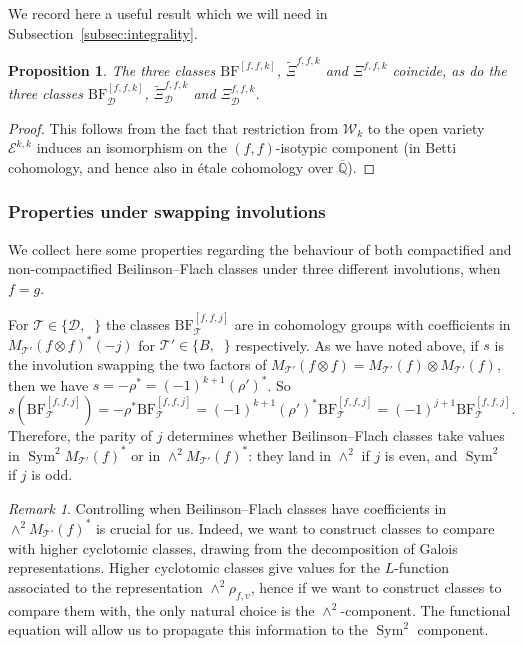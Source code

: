 \documentclass[11pt, a4paper, reqno]{amsart}
\theoremstyle{definition}
\theoremstyle{plain}
\newtheorem{proposition}[definition]{Proposition}
\theoremstyle{remark}
\newtheorem*{remark}{Remark}
\DeclareMathOperator{\Sym}{Sym}
\DeclareMathOperator{\et}{\acute{e}t}
\newcommand{\numberset}{\mathbb}
\newcommand{\Q}{\numberset{Q}}
\newcommand{\Ell}{\mathcal{E}}
\newcommand{\KS}{\mathscr{W}}
\newcommand{\theory}{\mathcal{T}}
\newcommand{\BF}{\mathrm{BF}}
\newcommand{\lcBF}{\widetilde{\Xi}}
\newcommand{\cBF}{\Xi}
\newcommand{\del}{\mathcal{D}}
\begin{document}
We record here a useful result which we will need in Subsection~\ref{subsec:integrality}.

\begin{proposition}
    \label{prop:classes-of-f-coincide}
    The three classes $\BF^{[f,f,k]}_{\et}$, $\lcBF^{f,f,k}_{\et}$ and $\cBF^{f,f,k}_{\et}$ coincide, as do the three classes $\BF^{[f,f,k]}_{\del}$, $\lcBF^{f,f,k}_{\del}$ and $\cBF^{f,f,k}_{\del}$.
\end{proposition}

\begin{proof}
 This follows from the fact that restriction from $\KS_k$ to the open variety $\Ell^{k, k}$ induces an isomorphism on the $(f, f)$-isotypic component (in Betti cohomology, and hence also in \'etale cohomology over $\overline{\Q}$).
\end{proof}

\subsubsection{Properties under swapping involutions}
\label{subsubsec:swapping}
We collect here some properties regarding the behaviour of both compactified and non-compactified Beilinson--Flach classes under three different involutions, when $f=g$.

For $\theory\in\{\del,\et\}$ the classes $\BF^{[f,f,j]}_{\theory}$ are in cohomology groups with coefficients in $M_{\theory'}(f\otimes f)^*(-j)$ for $\theory'\in\{B,\et\}$ respectively. As we have noted above, if $s$ is the involution swapping the two factors of $M_{\theory'}(f\otimes f) = M_{\theory'}(f) \otimes M_{\theory'}(f)$, then we have $s = - \rho^* = (-1)^{k+1} (\rho')^*$. So
\[
    s(\BF^{[f,f,j]}_{\theory}) = -\rho^* \BF^{[f,f,j]}_{\theory} = (-1)^{k+1}(\rho')^* \BF^{[f,f,j]}_{\theory} = (-1)^{j+1}\BF^{[f,f,j]}_{\theory}.
\]
Therefore, the parity of $j$ determines whether Beilinson--Flach classes take values in $\Sym^2 M_{\theory'}(f)^*$ or in $\wedge^2 M_{\theory'}(f)^*$: they land in $\wedge^2$ if $j$ is even, and $\Sym^2$ if $j$ is odd.

\begin{remark}
Controlling when Beilinson--Flach classes have coefficients in $\wedge^2 M_{\theory'}(f)^*$ is crucial for us. Indeed, we want to construct classes to compare with higher cyclotomic classes, drawing from the decomposition of Galois representations. Higher cyclotomic classes give values for the $L$-function associated to the representation $\wedge^2 \rho_{f,v}$, hence if we want to construct classes to compare them with, the only natural choice is the $\wedge^2$-component. The functional equation will allow us to propagate this information to the $\Sym^2$ component.
\end{remark}
\end{document}
